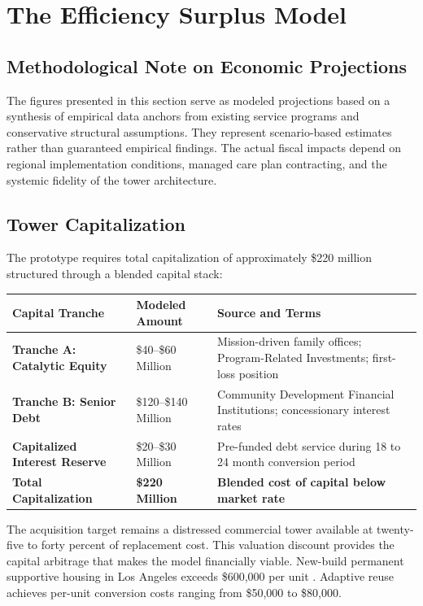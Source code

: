 \documentclass[12pt, letterpaper]{article}
\begin{document}
\newpage
\section{The Efficiency Surplus Model}

\subsection{Methodological Note on Economic Projections}

The figures presented in this section serve as modeled projections based on a synthesis of empirical data anchors from existing service programs and conservative structural assumptions. They represent scenario-based estimates rather than guaranteed empirical findings. The actual fiscal impacts depend on regional implementation conditions, managed care plan contracting, and the systemic fidelity of the tower architecture.

\subsection{Tower Capitalization}

The prototype requires total capitalization of approximately \$220 million structured through a blended capital stack:

\begin{table}[H]
\centering
\begin{tabularx}{\textwidth}{@{}lXX@{}}
\toprule
\textbf{Capital Tranche} & \textbf{Modeled Amount} & \textbf{Source and Terms} \\
\midrule
\textbf{Tranche A: Catalytic Equity} & \$40--\$60 Million & Mission-driven family offices; Program-Related Investments; first-loss position \\
\textbf{Tranche B: Senior Debt} & \$120--\$140 Million & Community Development Financial Institutions; concessionary interest rates \\
\textbf{Capitalized Interest Reserve} & \$20--\$30 Million & Pre-funded debt service during 18 to 24 month conversion period \\
\textbf{Total Capitalization} & \textbf{\$220 Million} & \textbf{Blended cost of capital below market rate} \\
\bottomrule
\end{tabularx}
\end{table}

The acquisition target remains a distressed commercial tower available at twenty-five to forty percent of replacement cost. This valuation discount provides the capital arbitrage that makes the model financially viable. New-build permanent supportive housing in Los Angeles exceeds \$600,000 per unit \citep{pacific_research_2024}. Adaptive reuse achieves per-unit conversion costs ranging from \$50,000 to \$80,000.
\end{document}
